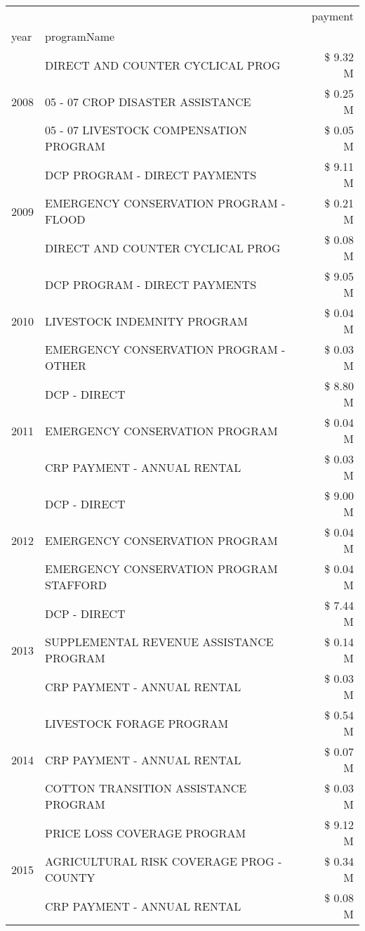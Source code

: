 \begin{tabular}{llr}
\toprule
 &  & payment \\
year & programName &  \\
\midrule
\multirow[t]{3}{*}{2008} & DIRECT AND COUNTER CYCLICAL PROG & \$ 9.32 M \\
 & 05 - 07 CROP DISASTER ASSISTANCE & \$ 0.25 M \\
 & 05 - 07 LIVESTOCK COMPENSATION PROGRAM & \$ 0.05 M \\
\cline{1-3}
\multirow[t]{3}{*}{2009} & DCP PROGRAM - DIRECT PAYMENTS & \$ 9.11 M \\
 & EMERGENCY CONSERVATION PROGRAM - FLOOD & \$ 0.21 M \\
 & DIRECT AND COUNTER CYCLICAL PROG & \$ 0.08 M \\
\cline{1-3}
\multirow[t]{3}{*}{2010} & DCP PROGRAM - DIRECT PAYMENTS & \$ 9.05 M \\
 & LIVESTOCK INDEMNITY PROGRAM & \$ 0.04 M \\
 & EMERGENCY CONSERVATION PROGRAM - OTHER & \$ 0.03 M \\
\cline{1-3}
\multirow[t]{3}{*}{2011} & DCP - DIRECT & \$ 8.80 M \\
 & EMERGENCY CONSERVATION PROGRAM & \$ 0.04 M \\
 & CRP PAYMENT - ANNUAL RENTAL & \$ 0.03 M \\
\cline{1-3}
\multirow[t]{3}{*}{2012} & DCP - DIRECT & \$ 9.00 M \\
 & EMERGENCY CONSERVATION PROGRAM & \$ 0.04 M \\
 & EMERGENCY CONSERVATION PROGRAM STAFFORD & \$ 0.04 M \\
\cline{1-3}
\multirow[t]{3}{*}{2013} & DCP - DIRECT & \$ 7.44 M \\
 & SUPPLEMENTAL REVENUE ASSISTANCE PROGRAM & \$ 0.14 M \\
 & CRP PAYMENT - ANNUAL RENTAL & \$ 0.03 M \\
\cline{1-3}
\multirow[t]{3}{*}{2014} & LIVESTOCK FORAGE PROGRAM & \$ 0.54 M \\
 & CRP PAYMENT - ANNUAL RENTAL & \$ 0.07 M \\
 & COTTON TRANSITION ASSISTANCE PROGRAM & \$ 0.03 M \\
\cline{1-3}
\multirow[t]{3}{*}{2015} & PRICE LOSS COVERAGE PROGRAM & \$ 9.12 M \\
 & AGRICULTURAL RISK COVERAGE PROG - COUNTY & \$ 0.34 M \\
 & CRP PAYMENT - ANNUAL RENTAL & \$ 0.08 M \\
\cline{1-3}

\end{tabular}
